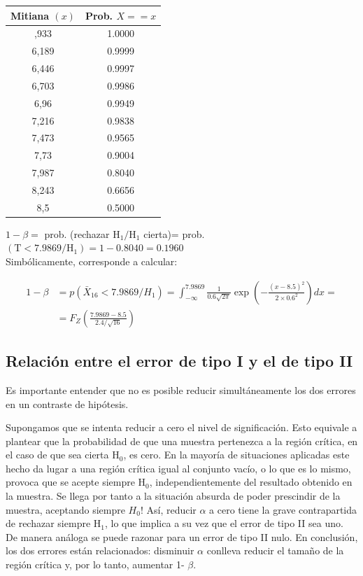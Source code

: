 \documentclass[
]{article}
\begin{document}
\begin{longtable}[]{@{}cc@{}}
\toprule\noalign{}
Mitiana \((x)\) & Prob. \(X==x\) \\
\midrule\noalign{}
\endhead
\bottomrule\noalign{}
\endlastfoot
5,933 & 1.0000 \\
6,189 & 0.9999 \\
6,446 & 0.9997 \\
6,703 & 0.9986 \\
6,96 & 0.9949 \\
7,216 & 0.9838 \\
7,473 & 0.9565 \\
7,73 & 0.9004 \\
7,987 & 0.8040 \\
8,243 & 0.6656 \\
8,5 & 0.5000 \\
\end{longtable}

\(1-\beta=\) prob. (rechazar \(\mathrm{H}_{1}/\mathrm{H}_{1}\) cierta)= prob. \((\mathrm{T}<7.9869/\mathrm{H}_{1})=1-0.8040=0.1960\)\\
Simbólicamente, corresponde a calcular:

\[
\begin{aligned}
1-\beta & =p\left(\bar{X}_{16}<7.9869 / H_{1}\right)=\int_{-\infty}^{7.9869} \frac{1}{0.6 \sqrt{2 \pi}} \exp \left(-\frac{(x-8.5)^{2}}{2 \times 0.6^{2}}\right) d x =\\
& =F_{Z}\left(\frac{7.9869-8.5}{2.4 / \sqrt{16}}\right)
\end{aligned}
\]

\subsection{Relación entre el error de tipo I y el de tipo II}\label{relaciuxf3n-entre-el-error-de-tipo-i-y-el-de-tipo-ii}

Es importante entender que no es posible reducir simultáneamente los dos errores en un contraste de hipótesis.

Supongamos que se intenta reducir a cero el nivel de significación. Esto equivale a plantear que la probabilidad de que una muestra pertenezca a la región crítica, en el caso de que sea cierta \(\mathrm{H}_{0}\), es cero. En la mayoría de situaciones aplicadas este hecho da lugar a una región crítica igual al conjunto vacío, o lo que es lo mismo, provoca que se acepte siempre \(\mathrm{H}_{0}\), independientemente del resultado obtenido en la muestra. Se llega por tanto a la situación absurda de poder prescindir de la muestra, aceptando siempre \(H_{0}\)! Así, reducir \(\alpha\) a cero tiene la grave contrapartida de rechazar siempre \(\mathrm{H}_{1}\), lo que implica a su vez que el error de tipo II sea uno. De manera análoga se puede razonar para un error de tipo II nulo. En conclusión, los dos errores están relacionados: disminuir \(\alpha\) conlleva reducir el tamaño de la región crítica y, por lo tanto, aumentar 1- \(\beta\).
\end{document}
